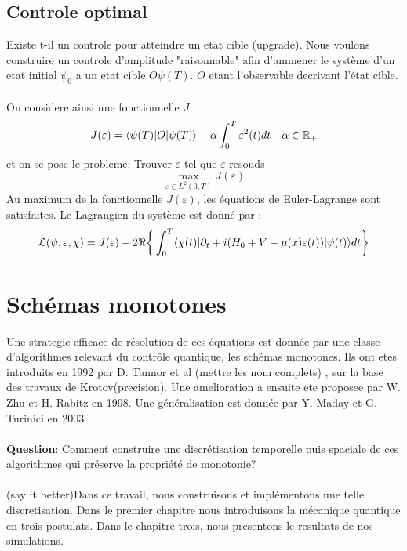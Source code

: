 \subsection*{Controle optimal}
Existe t-il un controle pour atteindre un etat cible (upgrade).
Nous voulons construire un controle d'amplitude "raisonnable" afin d'ammener le système d'un etat initial $\psi_0$ a un etat cible $O\psi(T)$. $O$ etant l'observable decrivant l'état cible.\\\\
On considere ainsi une fonctionnelle $J$
\begin{equation}
J(\varepsilon) = \langle \psi(T)|O|\psi(T) \rangle - \alpha \int_{0}^{T}\varepsilon^2(t)dt \quad \alpha \in \mathbb R_+
\end{equation}
et on se pose le probleme: Trouver $\varepsilon$ tel que $\varepsilon$ resouds
$$ \max_{\varepsilon \in L^2(0,T)} J(\varepsilon)$$
Au maximum de la fonctionnelle $J(\varepsilon)$, les équations de Euler-Lagrange sont satisfaites. Le Lagrangien du système est donné par :
\begin{equation} \label{lagrangien}
\mathcal{L}(\psi,\varepsilon,\chi)= J(\varepsilon)\\
-2\Re \bigg\{ \int_{0}^{T}\langle \chi (t)|\partial_{t}+i(H_0+V-\mu(x)\varepsilon(t))|\psi(t) \rangle dt \bigg\}
\end{equation}
\section*{Schémas monotones}
Une strategie efficace de résolution de ces équations est donnée par une classe d’algorithmes relevant du contrôle quantique, les schémas monotones. Ils ont etes introduits en 1992 par D. Tannor et al (mettre les nom complets) \cite{Tannor}, sur la base des travaux de Krotov(precision). Une amelioration a ensuite ete proposee par W. Zhu et H. Rabitz \cite{Zhu} en 1998. Une généralisation est donnée par Y. Maday et G. Turinici en 2003 \cite{Maday}\\\\
\textbf{Question}: Comment construire une discrétisation temporelle puis spaciale de ces algorithmes qui préserve la propriété de monotonie?\\\\
(say it better)Dans ce travail, nous construisons et implémentons une telle discretisation.
Dans le premier chapitre nous introduisons la mécanique quantique en trois postulats.
Dans le chapitre trois, nous presentons le resultats de nos simulations.

